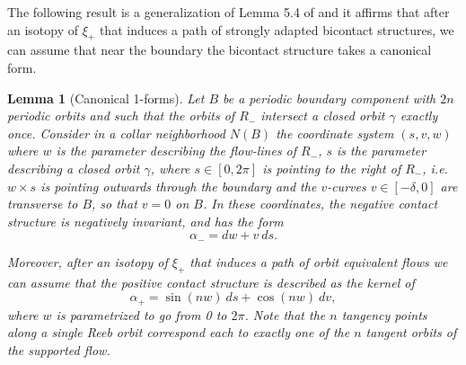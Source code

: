 \documentclass{amsart}
\newtheorem{lemma}[theorem]{Lemma}
\theoremstyle{definition}
\theoremstyle{remark}
\begin{document}
The following result is a generalization of Lemma 5.4 of \cite{Sal1} and it affirms that after an isotopy of $\xi_+$ that induces a path of strongly adapted bicontact structures, we can assume that near the boundary the bicontact structure takes a canonical form.
\begin{lemma}[Canonical 1-forms]
Let $B$ be a periodic boundary component with $2n$ periodic orbits and such that the orbits of $R_-$ intersect a closed orbit $\gamma$ exactly once. Consider in a collar neighborhood  $N(B)$ the coordinate system $(s,v,w)$ where $w$ is the parameter describing the flow-lines of $R_-$, $s$ is the parameter describing a closed orbit $\gamma$, where $s\in [0,2\pi]$ is pointing to the right of $R_-$, i.e. $w\times s$ is pointing outwards through the boundary and the $v$-curves $v\in [-\delta,0]$ are transverse to $B$, so that $v=0$ on $B$.
In these coordinates, the negative contact structure is negatively invariant, and has the form $$\alpha_-=dw+v\:ds.$$ 

Moreover, after an isotopy of $\xi_+$ that induces a path of orbit equivalent flows we can assume that the positive contact structure is described as the kernel of  $$\alpha_+=
\sin(n w)\:ds+\cos(n w)\:dv,$$ where $w$ is parametrized to go from 0 to $2\pi$. Note that the $n$ tangency points along a single Reeb orbit correspond each to exactly one of the $n$ tangent orbits of the supported flow.
\end{lemma}
\end{document}
